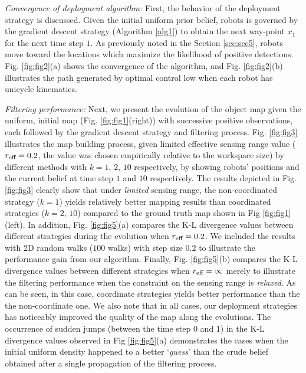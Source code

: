 \documentclass[letterpaper, 10 pt, conference]{ieeeconf}
\begin{document}
\textit{Convergence of deployment algorithm:}
First, the behavior of the deployment strategy is discussed. Given the initial uniform prior belief, robots is governed by the gradient descent strategy (Algorithm \ref{alg1}) to obtain the next way-point $x_1$ for the next time step $1$. As previously noted in the Section \ref{sec:sec5}, robots move toward the locations which maximize the likelihood of positive detections.
Fig. \ref{fig:fig2}(a) shows the convergence of the algorithm, and Fig. \ref{fig:fig2}(b) illustrates the path generated by optimal control low when each robot has unicycle kinematics. 

\textit{Filtering performance:}
Next, we present the evolution of the object map given the uniform, initial map (Fig. \ref{fig:fig1}(right)) with successive positive observations, each followed by the gradient descent strategy and filtering process. Fig. \ref{fig:fig3} illustrates the map building process, given limited effective sensing range value ($r_{\textup{eff}}=0.2$, the value was chosen empirically relative to the workspace size) 
by different methods with $k=1,\,2,\,10$ respectively, by showing robots' positions and the current belief at time step $1$ and $10$ respectively.
The results depicted in Fig. \ref{fig:fig3} clearly show that under \emph{limited} sensing range, the non-coordinated strategy ($k=1$) yields relatively better mapping results than coordinated strategies ($k=2,\,10$) compared to the ground truth map shown in Fig \ref{fig:fig1}(left).
In addition, Fig. \ref{fig:fig5}(a) compares the K-L divergence values 
between different strategies during the evolution when $r_{\textup{eff}} =0.2$. We included the results with 2D random walks ($100$ walks) with step size $0.2$ to illustrate the performance gain from our algorithm.
Finally, Fig. \ref{fig:fig5}(b) compares the K-L divergence values between different strategies when $r_{\textup{eff}}=\infty$ merely to illustrate the filtering performance when the constraint on the sensing range is \emph{relaxed}. As can be seen, in this case, coordinate strategies yields better performance than the the non-coordinate one.
We also note that in all cases, our deployment strategies has noticeably improved the quality of the map along the evolutions.
The occurrence of sudden jumps (between the time step 0 and 1) in the K-L divergence values observed in Fig \ref{fig:fig5}(a) demonstrates the cases when the initial uniform density happened to a better `\emph{guess}' than the crude belief obtained after a single propagation of the filtering process.
\end{document}
